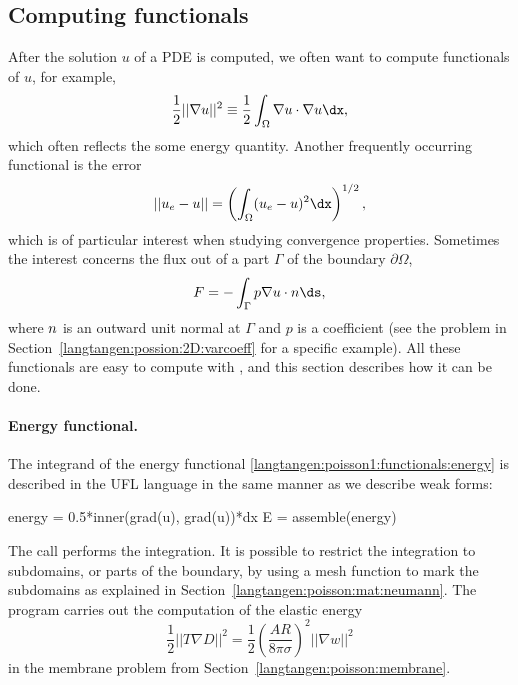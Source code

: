\subsection{Computing functionals}
\label{langtangen:poisson1:functionals}

After the solution $u$ of a PDE is computed, we often want to compute
functionals of $u$, for example,
\begin{equation}
  \frac{1}{2} ||\nabla u||^2 \equiv \frac{1}{2}\int_\Omega \nabla u\cdot \nabla u\dx,
\label{langtangen:poisson1:functionals:energy}
\end{equation}
which often reflects the some energy quantity.
Another frequently occurring functional is the error
\begin{equation}
||u_e-u|| = \left(\int_\Omega (u_e-u)^2\dx\right)^{1/2},
\label{langtangen:poisson1:functionals:error}
\end{equation}
which is of particular interest when studying convergence properties.
Sometimes the interest concerns the flux out of a part $\Gamma$ of
the boundary $\partial\Omega$,
\begin{equation}
F = -\int_\Gamma p\nabla u\cdot\langtangennormalvec\ds,
\label{langtangen:poisson1:functionals:flux}
\end{equation}
where ${n}$ is an outward unit normal at $\Gamma$ and $p$ is a
coefficient (see the problem in Section~\ref{langtangen:possion:2D:varcoeff}
for a specific example).
All these functionals are easy to compute with \fenics, and this section
describes how it can be done.

\paragraph{Energy functional.}
The integrand of the
energy functional \eqref{langtangen:poisson1:functionals:energy}
is described in the UFL language in the same manner as we describe
weak forms:
\begin{python}
energy = 0.5*inner(grad(u), grad(u))*dx
E = assemble(energy)
\end{python}
The  call performs the
integration.  It is possible to restrict the integration to
subdomains, or parts of the boundary, by using a mesh function to mark
the subdomains as explained in
Section~\ref{langtangen:poisson:mat:neumann}.  The program
 carries out the
computation of the elastic energy
\[ \frac{1}{2}||T\nabla D||^2 = \frac{1}{2}\left(\frac{AR}{8\pi\sigma}\right)^2
||\nabla w||^2\]
in the membrane problem from
Section~\ref{langtangen:poisson:membrane}.

